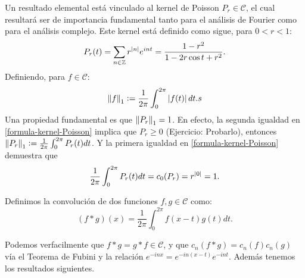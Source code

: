 Un resultado elemental está vinculado al kernel de Poisson \(P_r \in \mathcal{C}\), el cual resultará ser de importancia fundamental tanto para 
el análisis de Fourier como para el análisis complejo. Este kernel está definido como sigue, para \(0 < r < 1\):
\begin{equation}\label{formula-kernel-Poisson}
\displaystyle P_r(t)= \sum_{n\in \mathbb{Z}} r^{\left\lvert n\right\rvert}e^{int} = \frac{1-r^2}{1-2r\cos t + r^2}.
\end{equation}
Definiendo, para \(f\in \mathcal{C}\):
\[
\left\lVert f\right\rVert_1 \vcentcolon = \frac{1}{2\pi}\int_{0}^{2\pi} \left\lvert f(t)\right\rvert dt.s
\]
Una propiedad fundamental es que \(\left\lVert P_r\right\rVert_1 = 1\). En efecto, la segunda igualdad en \ref{formula-kernel-Poisson} implica que \(P_r\geq 0\) 
(Ejercicio: Probarlo), entonces \(\left\lVert P_r\right\rVert_1 \vcentcolon = \frac{1}{2\pi}\int_{0}^{2\pi} P_r(t) dt \). Y la primera igualdad en \ref{formula-kernel-Poisson}
demuestra que 
\[
\frac{1}{2\pi}\int_{0}^{2\pi} P_r(t) dt = c_0(P_r)= r^{\left\lvert0\right\rvert} = 1.
\]

\begin{defi}[Convolución]
Definimos la convolución de dos funciones \(f, g\in \mathcal{C}\) como:
\[
(f * g) (x) = \frac{1}{2\pi}\int_{0}^{2\pi} f(x-t)g(t) dt.
\]
\end{defi}
Podemos verfacilmente que \(f * g = g * f \in \mathcal{C} \), y que \(c_n(f * g) = c_n(f)c_n(g)\) vía el Teorema de Fubini y la relación 
\(e^{-inx} = e^{-in(x-t)}e^{-int}\). Además tenemos los resultados siguientes.


